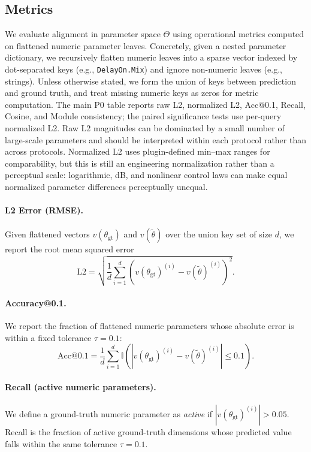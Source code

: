 \subsection{Metrics}
\label{ssec:metrics}
We evaluate alignment in parameter space $\Theta$ using operational metrics computed on flattened numeric parameter leaves. Concretely, given a nested parameter dictionary, we recursively flatten numeric leaves into a sparse vector indexed by dot-separated keys (e.g., \texttt{DelayOn.Mix}) and ignore non-numeric leaves (e.g., strings). Unless otherwise stated, we form the union of keys between prediction and ground truth, and treat missing numeric keys as zeros for metric computation. The main P0 table reports raw L2, normalized L2, Acc@0.1, Recall, Cosine, and Module consistency; the paired significance tests use per-query normalized L2. Raw L2 magnitudes can be dominated by a small number of large-scale parameters and should be interpreted within each protocol rather than across protocols. Normalized L2 uses plugin-defined min--max ranges for comparability, but this is still an engineering normalization rather than a perceptual scale: logarithmic, dB, and nonlinear control laws can make equal normalized parameter differences perceptually unequal.

\paragraph{L2 Error (RMSE).}
Given flattened vectors $v(\theta_{\text{gt}})$ and $v(\tilde{\theta})$ over the union key set of size $d$, we report the root mean squared error
\begin{equation}
	\text{L2} = \sqrt{\frac{1}{d}\sum_{i=1}^{d}\left(v(\theta_{\text{gt}})^{(i)} - v(\tilde{\theta})^{(i)}\right)^2}.
\end{equation}

\paragraph{Accuracy@0.1.}
We report the fraction of flattened numeric parameters whose absolute error is within a fixed tolerance $\tau=0.1$:
\begin{equation}
	\text{Acc@0.1} = \frac{1}{d}\sum_{i=1}^{d}\mathbb{I}\left(\left|v(\theta_{\text{gt}})^{(i)} - v(\tilde{\theta})^{(i)}\right| \leq 0.1\right).
\end{equation}

\paragraph{Recall (active numeric parameters).}
We define a ground-truth numeric parameter as \emph{active} if $\left|v(\theta_{\text{gt}})^{(i)}\right|>0.05$. Recall is the fraction of active ground-truth dimensions whose predicted value falls within the same tolerance $\tau=0.1$.

